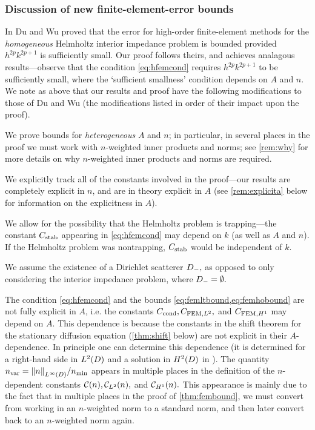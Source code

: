 \subsubsection{Discussion of new finite-element-error bounds}

In \cite{DuWu:15} Du and Wu proved that the error for high-order finite-element methods for the \emph{homogeneous} Helmholtz interior impedance problem is bounded provided $h^{2p}k^{2p+1}$ is sufficiently small. Our proof follows theirs, and achieves analagous results---observe that the condition \cref{eq:hfemcond} requires $h^{2p}k^{2p+1}$ to be sufficiently small, where the `sufficient smallness' condition depends on $A$ and $n$. We note as above that our results and proof have the following modifications to those of Du and Wu (the modifications listed in order of their impact upon the proof).
\ben
\item We prove bounds for \emph{heterogeneous} $A$ and $n$; in particular, in several places in the proof we must work with $n$-weighted inner products and norms; see \cref{rem:why} for more details on why $n$-weighted inner products and norms are required.
\item We explicitly track all of the constants involved in the proof---our results are completely explicit in $n$, and are in theory explicit in $A$ (see \cref{rem:explicita} below for information on the explicitness in $A$).
\item We allow for the possibility that the Helmholtz problem is trapping---the constant $C_{\mathrm{stab}}$ appearing in \cref{eq:hfemcond} may depend on $k$ (as well as $A$ and $n$). If the Helmholtz problem was nontrapping, $C_{\mathrm{stab}}$ would be independent of $k$.
  \item We assume the existence of a Dirichlet scatterer $D_{-},$ as opposed to only considering the interior impedance problem, where $D_{-}=\emptyset.$
\een
\ere

\label{rem:explicita}
The condition \cref{eq:hfemcond} and the bounds \cref{eq:femltbound,eq:femhobound} are not fully explicit in $A$, i.e. the constants $C_{\mathrm{cond}}, C_{\mathrm{FEM},L^{2}},$ and $C_{\mathrm{FEM},H^{1}}$ may depend on $A$. This dependence is because the constants in the shift theorem for the stationary diffusion equation (\cref{thm:shift} below) are not explicit in their $A$-dependence. In principle one can determine this dependence (it is determined for a right-hand side in $\LtD$ and a solution in $\HtD$ in \cite[Appendix A]{ChScTe:13}).
\ere
{}\label{rem:nvar}
The quantity $\nvar = \NLiD{n}/\nmin$ appears in multiple places in the definition of the $n$-dependent constants $\mathcal C(n), \mathcal C_{L^{2}}(n),$ and $\mathcal C_{H^{1}}(n).$ This appearance is mainly due to the fact that in multiple places in the proof of \cref{thm:fembound}, we must convert from working in an $n$-weighted norm to a standard norm, and then later convert back to an $n$-weighted norm again.

